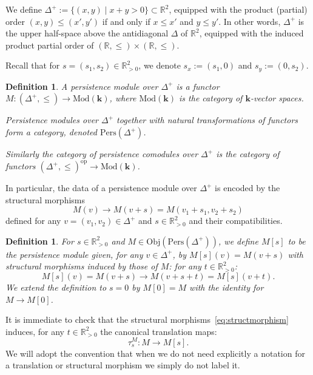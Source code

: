 \documentclass[a4paper, english, 11pt]{article}
\newcommand{\kk}[0]{\textbf{k}}
\newcommand{\Mod}[0]{\text{Mod}}
\newcommand{\0}{\vec{0}}
\newcommand{\R}[0]{\mathbb{R}}
\newcommand{\Obj}[0]{\text{Obj}}
\newcommand{\op}[0]{\text{op}}
\newcommand{\Pers}[0]{\text{Pers}}
\newtheorem{defi}[prop]{Definition}
\begin{document}
We define $\Delta^+ := \{(x,y)\mid x+y > 0\}\subset \R^2$, equipped with the product (partial) order $(x,y)\leq (x',y')$ if and only if $x\leq x'$ and $y\leq y' $. 
In other words, $\Delta^+$ is the upper half-space above the antidiagonal $\Delta$ of $\R^2$, equipped with the induced product partial order of $(\R, \leq)\times (\R, \leq)$.

\smallskip

Recall that for $s=(s_1,s_2)\in \R^2_{>0}$, we denote $s_x:=(s_1,0)$ and $s_y := (0,s_2)$. 

\begin{defi}\label{D:PerModule}
A persistence module over $\Delta^+$ is a functor $M : (\Delta^+,\leq) \longrightarrow \Mod(\kk)$, where $\Mod(\kk)$ is the category of $\kk$-vector spaces.

Persistence modules over $\Delta^+$ together with natural transformations of functors form a category, denoted $\Pers(\Delta^+)$.

Similarly the category of persistence comodules over $\Delta^+$ is the category of functors $(\Delta^+,\leq)^{\op} \longrightarrow \Mod(\kk)$.
\end{defi}
In particular, the data of a  persistence module over $\Delta^+$ is encoded by the  structural  morphisms  
\begin{equation}\label{eq:structmorphism}
    M(v) \longrightarrow M(v+s)= M(v_1+s_1, v_2+s_2)
\end{equation}
defined for any $v=(v_1,v_2)\in \Delta^+$ and $s\in \R^2_{>0}$ and their compatibilities. 

\begin{defi}\label{D:shiftedpersitent} For $s\in \R^2_{>0}$ and $M\in \Obj( \Pers(\Delta^+))$, we define 
$M[s]$ to be the persistence module given, for any $v\in \Delta^+$, by $M[s](v)= M(v+s)$ with structural morphisms induced by those of $M$: for any $t\in \R^2_{>0}$:
$$ M[s](v)=M(v+s) \longrightarrow M(v+s+t)=M[s](v+t).$$
We extend the definition to $s=0$ by $M[0]=M$ with the identity for  $M\to M[0]$.
\end{defi}
It is immediate to check that the structural morphisms~\eqref{eq:structmorphism}
induces, for any $t\in \R^2_{>0}$ the canonical translation maps:
\begin{equation}\label{eq:translmorphism}
   \tau_{s}^M: M \longrightarrow M[s].
\end{equation}
We will adopt the convention that when we do not need explicitly a notation for a translation or structural morphism we simply do not label it. 
\end{document}
